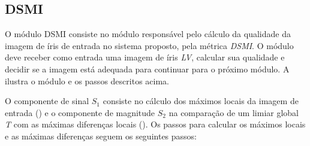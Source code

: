 \subsection{DSMI}\label{sec:metodologia:dsmi}

\par O módulo \acrshort{DSMI} consiste no módulo responsável pelo cálculo da qualidade da imagem de íris de entrada no sistema proposto, pela métrica \textit{\acrshort{DSMI}}. O módulo deve receber como entrada uma imagem de íris \textit{\acrshort{LV}}, calcular sua qualidade e decidir se a imagem está adequada para continuar para o próximo módulo. A  ilustra o módulo e os passos descritos acima.



\par O componente de sinal $S_{1}$ consiste no cálculo dos máximos locais da imagem de entrada () e o componente de magnitude $S_{2}$ na comparação de um limiar global \textit{T} com as máximas diferenças locais (). Os passos para calcular os máximos locais e as máximas diferenças seguem os seguintes passos:


